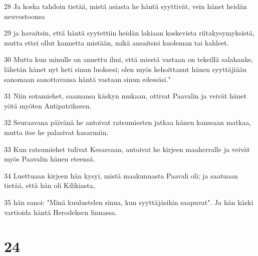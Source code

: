 \par 28 Ja koska tahdoin tietää, mistä asiasta he häntä syyttivät, vein hänet heidän neuvostoonsa
\par 29 ja havaitsin, että häntä syytettiin heidän lakiaan koskevista riitakysymyksistä, mutta ettei ollut kannetta mistään, mikä ansaitsisi kuoleman tai kahleet.
\par 30 Mutta kun minulle on annettu ilmi, että miestä vastaan on tekeillä salahanke, lähetän hänet nyt heti sinun luoksesi; olen myös kehoittanut hänen syyttäjiään sanomaan sanottavansa häntä vastaan sinun edessäsi."
\par 31 Niin sotamiehet, saamansa käskyn mukaan, ottivat Paavalin ja veivät hänet yötä myöten Antipatrikseen.
\par 32 Seuraavana päivänä he antoivat ratsumiesten jatkaa hänen kanssaan matkaa, mutta itse he palasivat kasarmiin.
\par 33 Kun ratsumiehet tulivat Kesareaan, antoivat he kirjeen maaherralle ja veivät myös Paavalin hänen eteensä.
\par 34 Luettuaan kirjeen hän kysyi, mistä maakunnasta Paavali oli; ja saatuaan tietää, että hän oli Kilikiasta,
\par 35 hän sanoi: "Minä kuulustelen sinua, kun syyttäjäsikin saapuvat". Ja hän käski vartioida häntä Herodeksen linnassa.

\chapter{24}

